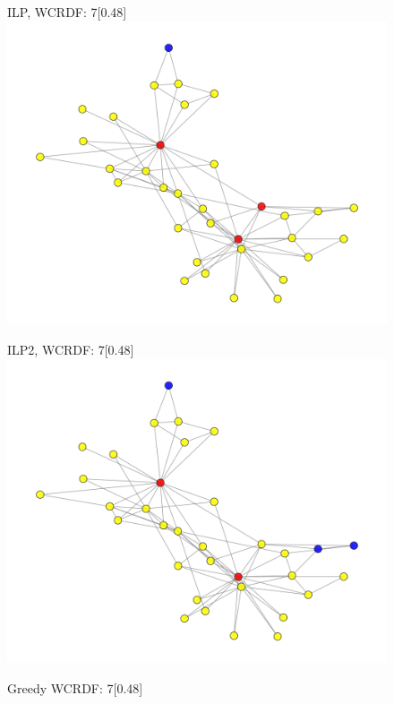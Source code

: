 \begin{figure}[htbp]
    \centering
    \begin{subcaptionbox}{ILP, WCRDF: 7\label{fig:ilp}}[0.48\linewidth]
        {\includegraphics[width=\linewidth]{assets/Facebook/ilp.png}}
    \end{subcaptionbox}
    \hfill
    \begin{subcaptionbox}{ILP2,  WCRDF: 7\label{fig:ilp2}}[0.48\linewidth]
        {\includegraphics[width=\linewidth]{assets/Facebook/ilp2.png}}
    \end{subcaptionbox}
    \hfill
    \begin{subcaptionbox}{Greedy  WCRDF: 7\label{fig:greedy}}[0.48\linewidth]

\end{subcaptionbox}
\end{figure}
